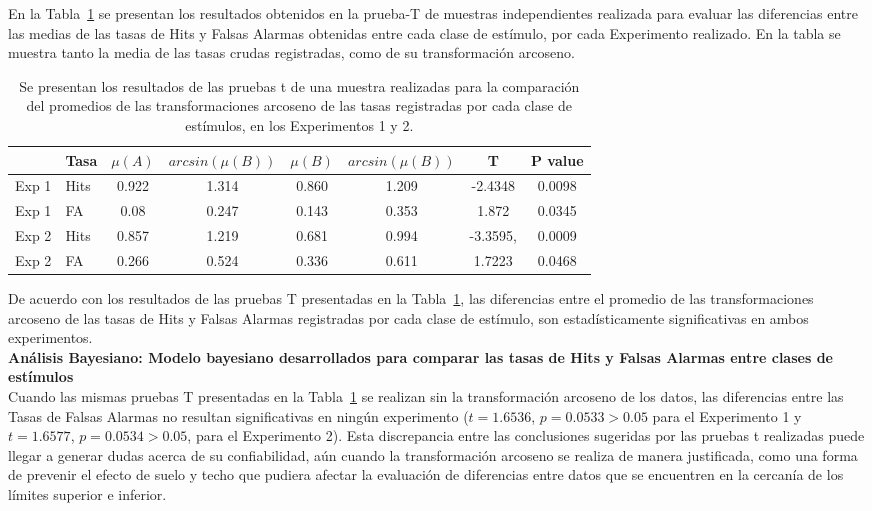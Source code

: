 En la Tabla~\ref{Tabla_t-HitsyFA} se presentan los resultados obtenidos en la prueba-T de muestras independientes realizada para evaluar las diferencias entre las medias de las tasas de Hits y Falsas Alarmas obtenidas entre cada clase de estímulo, por cada Experimento realizado. En la tabla se muestra tanto la media de las tasas crudas registradas, como de su transformación arcoseno.\\

\begin{table}
\caption[Prueba T para evaluar diferencias entre las tasas de ejecución (Hits y F. Alarmas) promedio registradas por cada condición]{Se presentan los resultados de las pruebas t de una muestra realizadas para la comparación del promedios de las transformaciones arcoseno de las tasas registradas por cada clase de estímulos, en los Experimentos 1 y 2.}
\label{Tabla_t-HitsyFA}
\centering
\begin{tabular}{l l | c c c c c c}
\toprule
\textbf{} & \textbf{Tasa} & \textbf{$\mu(A)$} & \textbf{$arcsin(\mu(B))$} & \textbf{$\mu(B)$} & \textbf{$arcsin(\mu(B))$} &\textbf{T} & \textbf{P value}\\
\midrule
Exp 1 & Hits & 0.922 & 1.314 & 0.860 & 1.209 & -2.4348 & 0.0098 \\
Exp 1 & FA & 0.08 & 0.247 & 0.143 & 0.353 & 1.872 & 0.0345 \\
Exp 2 & Hits & 0.857 & 1.219 & 0.681 & 0.994 & -3.3595, & 0.0009 \\
Exp 2 & FA & 0.266 & 0.524 & 0.336 & 0.611 & 1.7223 & 0.0468 \\
\bottomrule
\end{tabular}
\end{table}

De acuerdo con los resultados de las pruebas T presentadas en la Tabla~\ref{Tabla_t-HitsyFA}, las diferencias entre el promedio de las transformaciones arcoseno de las tasas de Hits y Falsas Alarmas registradas por cada clase de estímulo, son estadísticamente significativas en ambos experimentos.\\

\textbf{Análisis Bayesiano: Modelo bayesiano desarrollados para comparar las tasas de Hits y Falsas Alarmas entre clases de estímulos}\\

Cuando las mismas pruebas T presentadas en la Tabla~\ref{Tabla_t-HitsyFA} se realizan sin la transformación arcoseno de los datos, las diferencias entre las Tasas de Falsas Alarmas no resultan significativas en ningún experimento ($t=1.6536$, $p=0.0533>0.05$ para el Experimento 1 y $t=1.6577$, $p=0.0534>0.05$, para el Experimento 2). Esta discrepancia entre las conclusiones sugeridas por las pruebas t realizadas puede llegar a generar dudas acerca de su confiabilidad, aún cuando la transformación arcoseno se realiza de manera justificada, como una forma de prevenir el efecto de suelo y techo que pudiera afectar la evaluación de diferencias entre datos que se encuentren en la cercanía de los límites superior e inferior.\\

